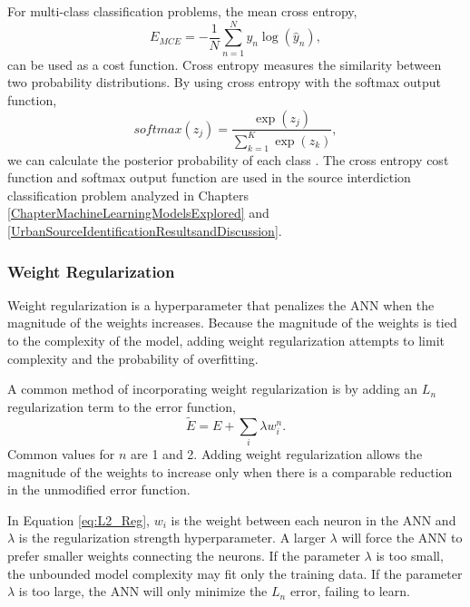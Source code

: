 For multi-class classification problems, the mean cross entropy,
%
\begin{equation} \label{eq:CrossEntropy}
E_{MCE} = -{\frac{1} N} \sum_{n=1}^N y_n \log(\hat{y}_n), 
\end{equation}
%
can be used as a cost function. Cross entropy measures the similarity between two probability distributions. By using cross entropy with the softmax output function,
%
\begin{equation} \label{eq:softmax}
softmax(z_j) = \frac{\exp(z_j)} {\sum_{k=1}^{K} \exp(z_k)},
\end{equation}
%
we can calculate the posterior probability of each class \cite{Bridle1990}. The cross entropy cost function and softmax output function are used in the source interdiction classification problem analyzed in Chapters \ref{ChapterMachineLearningModelsExplored} and \ref{UrbanSourceIdentificationResultsandDiscussion}.



\subsubsection{Weight Regularization}

Weight regularization is a hyperparameter that penalizes the ANN when the magnitude of the weights increases. Because the magnitude of the weights is tied to the complexity of the model, adding weight regularization attempts to limit complexity and the probability of overfitting.

A common method of incorporating weight regularization is by adding an $L_n$ regularization term to the error function, 
%
\begin{equation} \label{eq:L2_Reg}
\tilde{E} = E + \sum_i \lambda w_i^n.
\end{equation}
%
Common values for $n$ are 1 and 2. Adding weight regularization allows the magnitude of the weights to increase only when there is a comparable reduction in the unmodified error function.

In Equation \ref{eq:L2_Reg}, $w_i$ is the weight between each neuron in the ANN and $\lambda$ is the regularization strength hyperparameter. A larger $\lambda$ will force the ANN to prefer smaller weights connecting the neurons. If the parameter $\lambda$ is too small, the unbounded model complexity may fit only the training data. If the parameter $\lambda$ is too large, the ANN will only minimize the $L_n$ error, failing to learn.

